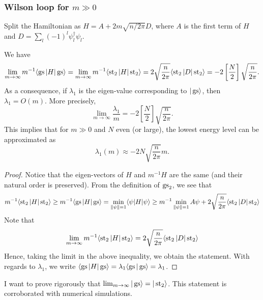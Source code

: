 \subsubsection{Wilson loop for $m \gg 0$}
Split the Hamiltonian as $H = A + 2m\sqrt{n/2\pi} D$, where $A$ is the first term of $H$ and $D = \sum_l (-1)^l \psi_l^\dagger \psi_l$.
\begin{statement}
We have 
\[
\lim_{m \rightarrow \infty}m^{-1} \langle \operatorname{gs} | H| \operatorname{gs}\rangle = \lim_{m \rightarrow \infty} m^{-1}\langle \operatorname{st}_2 | H| \operatorname{st}_2 \rangle =  2\sqrt{\frac{n}{2\pi}} \langle \operatorname{st}_2 | D| \operatorname{st}_2\rangle = -2\left[\frac{N}{2}\right]\sqrt{\frac{n}{2\pi}}.
\]
As a consequence, if $\lambda_1$ is the eigen-value corresponding to $|\operatorname{gs}\rangle$, then $\lambda_1 = O(m)$. More precisely, 
\[
\lim_{m \rightarrow \infty} \frac{\lambda_1}{m} = -2\left[\frac{N}{2}\right]\sqrt{\frac{n}{2\pi}}.
\]
This implies that for $m \gg 0$ and $N$ even (or large), the lowest energy level can be approximated as 
\[
\lambda_1(m) \approx -2 N \sqrt{\frac{n}{2\pi}}m.
\]
\end{statement}
\begin{proof}
Notice that the eigen-vectors of $H$ and $m^{-1}H$ are the same (and their natural order is preserved). From the definition of $\operatorname{gs}_2$, we see that
\[
m^{-1}\langle \operatorname{st}_2 | H| \operatorname{st}_2 \rangle \geq m^{-1}\langle \operatorname{gs} | H| \operatorname{gs} \rangle = \min_{\|\psi\|=1} \langle \psi |H|\psi\rangle \geq m^{-1}\min_{\|\psi\|=1} A\psi + 2\sqrt{\frac{n}{2\pi}} \langle \operatorname{st}_2 | D| \operatorname{st}_2\rangle 
\]
Note that 
\[
\lim_{m\rightarrow \infty} m^{-1}\langle \operatorname{st}_2 | H|\operatorname{st}_2 \rangle = 2\sqrt{\frac{n}{2\pi}} \langle \operatorname{st}_2 | D| \operatorname{st}_2\rangle
\]
Hence, taking the limit in the above inequality, we obtain the statement. With regards to $\lambda_1$, we write $\langle \operatorname{gs} | H| \operatorname{gs} \rangle = \lambda_1\langle \operatorname{gs} |\operatorname{gs}\rangle = \lambda_1$.
\end{proof}
\begin{quest}
I want to prove rigorously that $\lim_{m \rightarrow \infty} |\operatorname{gs} \rangle = |\operatorname{st}_2 \rangle$. This statement is corroborated with numerical simulations.
\end{quest}

